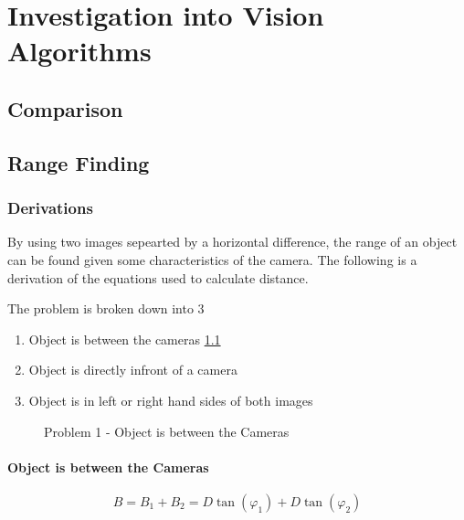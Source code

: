 \chapter{Investigation into Vision Algorithms} \label{Chapter:InvestigationVision}

\section{Comparison}

\section{Range Finding}

\subsection{Derivations}

By using two images sepearted by a horizontal difference, the range of an object can be found given some characteristics of the camera. The following is a derivation of the equations used to calculate distance. 

The problem is broken down into 3
\begin{enumerate}
\item Object is between the cameras \ref{problem_between}
\item Object is directly infront of a camera
\item Object is in left or right hand sides of both images
\end{enumerate}

\begin{figure}
\caption{Problem 1 - Object is between the Cameras}
\label{problem_between}
\end{figure}

\subsubsection{Object is between the Cameras}

\begin{equation} \label{eq:B}
B = B_{1} + B_{2} = D\tan(\varphi_{1}) + D\tan(\varphi_{2})
\end{equation}

